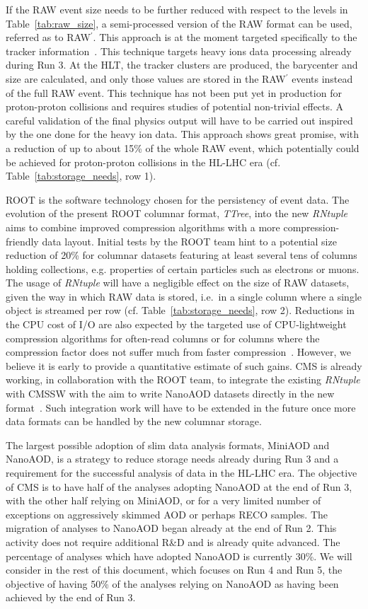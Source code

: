 \documentclass{cmspaper}
\begin{document}
If the RAW event size needs to be further reduced with respect to the levels in Table~\ref{tab:raw_size}, a semi-processed version of the RAW format can be used, referred as to RAW$^\prime$. This approach is at the moment targeted specifically to the tracker information~\cite{CERN-LHCC-2017-009}. This technique targets heavy ions data processing already during Run 3. At the HLT, the tracker clusters are produced, the barycenter and size are calculated, and only those values are stored in the RAW$^\prime$ events instead of the full RAW event. This technique has not been put yet in production for proton-proton collisions and requires studies of potential non-trivial effects. A careful validation of the final physics output will have to be carried out inspired by the one done for the heavy ion data. This approach shows great promise, with a reduction of up to about 15\% of the whole RAW event, which potentially could be achieved for proton-proton collisions in the HL-LHC era (cf. Table~\ref{tab:storage_needs}, row 1). 

ROOT is the software technology chosen for the persistency of event data. The evolution of the present ROOT columnar format, \textit{TTree}, into the new \textit{RNtuple} aims to combine improved compression algorithms with a more compression-friendly data layout. Initial tests by the ROOT team hint to a potential size reduction of 20\% for columnar datasets featuring at least several tens of columns holding collections, e.g. properties of certain particles such as electrons or muons. The usage of \textit{RNtuple} will have a negligible effect on the size of RAW datasets, given the way in which RAW data is stored, i.e.~in a single column where a single object is streamed per row (cf. Table~\ref{tab:storage_needs}, row 2).
Reductions in the CPU cost of I/O are also expected by the targeted use of CPU-lightweight compression algorithms for often-read columns or for columns where the compression factor does not suffer much from faster compression~\cite{Blomer:2715450}. However, we believe it is early to provide a quantitative estimate of such gains. 
CMS is already working, in collaboration with the ROOT team, to integrate the existing \textit{RNtuple} with CMSSW with the aim to write NanoAOD datasets directly in the new format~\cite{maxOrok}. Such integration work will have to be extended in the future once more data formats can be handled by the new columnar storage. 

The largest possible adoption of slim data analysis formats, MiniAOD and NanoAOD, is a strategy to reduce storage needs already during Run 3 and a requirement for the successful analysis of data in the HL-LHC era. The objective of CMS is to have half of the analyses adopting NanoAOD at the end of Run 3, with the other half relying on MiniAOD, or for a very limited number of exceptions on aggressively skimmed AOD or perhaps RECO samples. The migration of analyses to NanoAOD began already at the end of Run 2. This activity does not require additional R\&D and is already quite advanced. The percentage of analyses which have adopted NanoAOD is currently 30\%. We will consider in the rest of this document, which focuses on Run 4 and Run 5, the objective of having 50\% of the analyses relying on NanoAOD as having been achieved by the end of Run 3.
\end{document}

